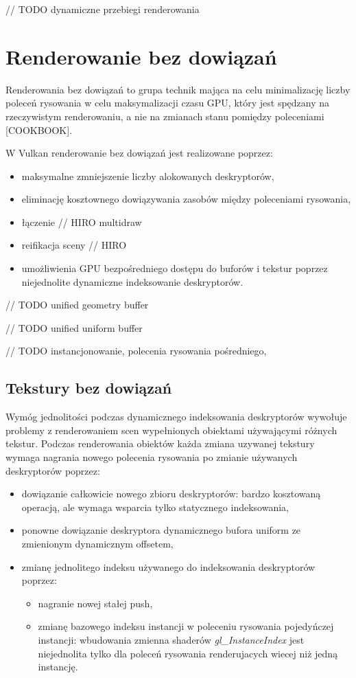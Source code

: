 // TODO dynamiczne przebiegi renderowania

\section{Renderowanie bez dowiązań}

Renderowania bez dowiązań to grupa technik mająca na celu minimalizację liczby poleceń rysowania w celu maksymalizacji czasu GPU, który jest spędzany na rzeczywistym renderowaniu, a nie na zmianach stanu pomiędzy poleceniami [COOKBOOK].

W Vulkan renderowanie bez dowiązań jest realizowane poprzez:
\begin{itemize}
	\item maksymalne zmniejszenie liczby alokowanych deskryptorów,
	\item eliminację kosztownego dowiązywania zasobów między poleceniami rysowania,
	\item łączenie // HIRO multidraw
	\item reifikacja sceny // HIRO
	\item umożliwienia GPU bezpośredniego dostępu do buforów i tekstur poprzez niejednolite dynamiczne indeksowanie deskryptorów.
\end{itemize}

// TODO unified geometry buffer

// TODO unified uniform buffer

// TODO instancjonowanie, polecenia rysowania pośredniego,

\subsection {Tekstury bez dowiązań}

Wymóg jednolitości podczas dynamicznego indeksowania deskryptorów wywołuje problemy z renderowaniem scen wypełnionych obiektami używającymi różnych tekstur.
Podczas renderowania obiektów każda zmiana uzywanej tekstury wymaga nagrania nowego polecenia rysowania po zmianie używanych deskryptorów poprzez:
\begin{itemize}
	\item dowiązanie całkowicie nowego zbioru deskryptorów: bardzo kosztowaną operacją, ale wymaga wsparcia tylko statycznego indeksowania,
	\item ponowne dowiązanie deskryptora dynamicznego bufora uniform ze zmienionym dynamicznym offsetem,
	\item zmianę jednolitego indeksu używanego do indeksowania deskryptorów poprzez:
	\begin{itemize}
		\item nagranie nowej stałej push,
		\item zmianę bazowego indeksu instancji w poleceniu rysowania pojedyńczej instancji: wbudowania zmienna shaderów \textit{gl\_InstanceIndex} jest niejednolita tylko dla poleceń rysowania renderujacych wiecej niż jedną instancję.
	\end{itemize}
\end{itemize}

